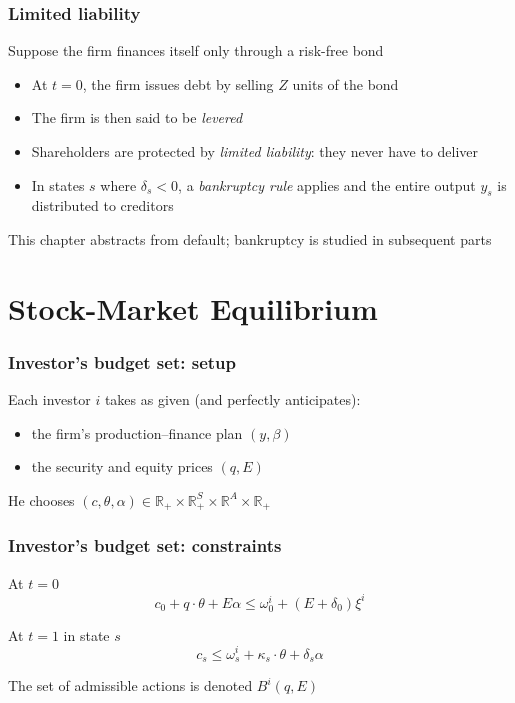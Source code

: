 \documentclass[blue]{beamer}
\def\R{\mathbb{R}}
\def\leq{\leqslant}
\theoremstyle{definition}
\theoremstyle{example}
\begin{document}
\begin{frame}\frametitle{Limited liability}
Suppose the firm finances itself only through a risk-free bond
\bigskip

\begin{itemize}
\item At $t=0$, the firm issues debt by selling $Z$ units of the bond
\item The firm is then said to be \emph{levered}
\item Shareholders are protected by \emph{limited liability}: they never have to deliver
\item In states $s$ where $\delta_s < 0$, a \emph{bankruptcy rule} applies and the entire output $y_s$ is distributed to creditors
\end{itemize}
\bigskip

This chapter abstracts from default; bankruptcy is studied in subsequent parts
\end{frame}

\section{Stock-Market Equilibrium}

\begin{frame}\frametitle{Investor's budget set: setup}
Each investor $i$ takes as given (and perfectly anticipates):
\begin{itemize}
\item the firm's production--finance plan $(y, \beta)$
\item the security and equity prices $(q, E)$
\end{itemize}
\bigskip

He chooses $(c, \theta, \alpha) \in \R_+ \times \R^S_+ \times \R^A \times \R_+$
\end{frame}

\begin{frame}\frametitle{Investor's budget set: constraints}
\begin{block}{At $t=0$}
\begin{equation*}
c_0 + q \cdot \theta + E\alpha \leq \omega^i_0 + (E + \delta_0)\xi^i
\end{equation*}
\end{block}

\begin{block}{At $t=1$ in state $s$}
\begin{equation*}
c_s \leq \omega^i_s + \kappa_s \cdot \theta + \delta_s \alpha
\end{equation*}
\end{block}
\bigskip

The set of admissible actions is denoted $B^i(q, E)$
\end{frame}
\end{document}
